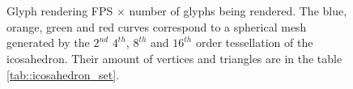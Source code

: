 \documentclass[twoside,twocolumn,10pt]{article}
\begin{document}
\begin{figure}[ht]
\centering
\captionsetup[subfloat]{farskip=0pt,nearskip=0pt}
    \\
    \\
     \caption{Glyph rendering FPS $\times$ number of glyphs being rendered. The blue, orange, green and red curves correspond to a spherical mesh  generated by the $2^{nd}$ $4^{th}$, $8^{th}$ and $16^{th}$ order tessellation of the icosahedron. Their amount of vertices and triangles are in the table \ref{tab::icosahedron_set}.} %
    \label{fig::benchmark}
\end{figure}
\end{document}
